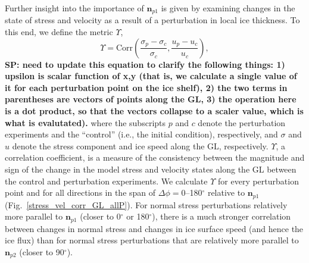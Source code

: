 \documentclass[review,oneside]{igs}
\begin{document}
Further insight into the importance of $\mathbf{n}_{p1}$ is given by examining changes in the state of stress and velocity as a result of a perturbation in local ice thickness. To this end, we define the metric $\Upsilon$,  
\begin{equation}
    \Upsilon= \textrm{Corr}\left(\frac{\sigma_{p}-\sigma_{c}}{\sigma_{c}}, \frac{u_{p}-u_{c}}{u_{c}}\right),
\label{upsilon}
\end{equation}
\textbf{SP: need to update this equation to clarify the following things: 1) upsilon is scalar function of x,y (that is, we calculate a single value of it for each perturbation point on the ice shelf), 2) the two terms in parentheses are vectors of points along the GL, 3) the operation here is a dot product, so that the vectors collapse to a scaler value, which is what is evalutated).}
where the subscripts $p$ and $c$ denote the perturbation experiments and the ``control'' (i.e., the initial condition), respectively, and $\sigma$ and $u$ denote the stress component and ice speed along the GL, respectively. $\Upsilon$, a correlation coefficient, is a measure of the consistency between the magnitude and sign of the change in the model stress and velocity states along the GL between the control and perturbation experiments. We calculate $\Upsilon$ for every perturbation point and for all directions in the span of $\Delta\phi=$0--180$^\circ$ relative to $\mathbf{n}_{p1}$ (Fig.~\ref{stress_vel_corr_GL_allP}). For normal stress perturbations relatively more parallel to $\mathbf{n}_{p1}$ (closer to 0$^\circ$ or 180$^\circ$), there is a much stronger correlation between changes in normal stress and changes in ice surface speed (and hence the ice flux) than for normal stress perturbations that are relatively more parallel to $\mathbf{n}_{p2}$ (closer to 90$^\circ$).  
\end{document}
